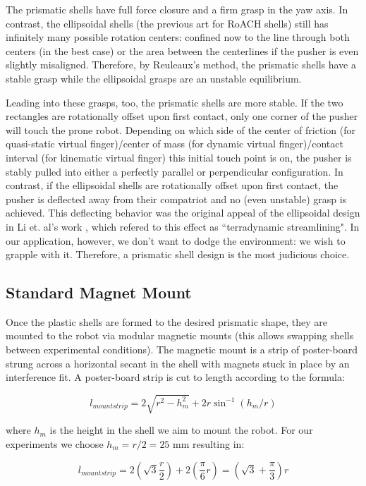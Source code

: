 \documentclass[letterpaper]{report}
\begin{document}
The prismatic shells have full force closure and a firm grasp in the yaw axis.
In contrast, the ellipsoidal shells (the previous art for RoACH shells) still has infinitely many possible rotation centers: confined now to the line through both centers (in the best case) or the area between the centerlines if the pusher is even slightly misaligned.
Therefore, by Reuleaux's method, the prismatic shells have a stable grasp while the ellipsoidal grasps are an unstable equilibrium.

Leading into these grasps, too, the prismatic shells are more stable.
If the two rectangles are rotationally offset upon first contact, only one corner of the pusher will touch the prone robot.
Depending on which side of the center of friction (for quasi-static virtual finger)/center of mass (for dynamic virtual finger)/contact interval (for kinematic virtual finger) this initial touch point is on, the pusher is stably pulled into either a perfectly parallel or perpendicular configuration.
In contrast, if the ellipsoidal shells are rotationally offset upon first contact, the pusher is deflected away from their compatriot and no (even unstable) grasp is achieved.
This deflecting behavior was the original appeal of the ellipsoidal design in Li et. al's work \cite{ChenTerradynamic}, which refered to this effect as ``terradynamic streamlining".
In our application, however, we don't want to dodge the environment: we wish to grapple with it.
Therefore, a prismatic shell design is the most judicious choice.

\subsection{Standard Magnet Mount}
Once the plastic shells are formed to the desired prismatic shape, they are mounted to the robot via modular magnetic mounts (this allows swapping shells between experimental conditions).
The magnetic mount is a strip of poster-board strung across a horizontal secant in the shell with magnets stuck in place by an interference fit.
A poster-board strip is cut to length according to the formula:

$$
l_{mountstrip} = 2 \sqrt{r^2 - h_m^2} + 2 r \sin^{-1}(h_m/r)
$$

where $h_m$ is the height in the shell we aim to mount the robot.
For our experiments we choose $h_m = r/2 = 25$ mm resulting in:

$$
l_{mountstrip} = 2 (\sqrt{3} \frac{r}{2}) + 2 (\frac{\pi}{6} r) = (\sqrt{3} + \frac{\pi}{3} ) r
$$
\end{document}
